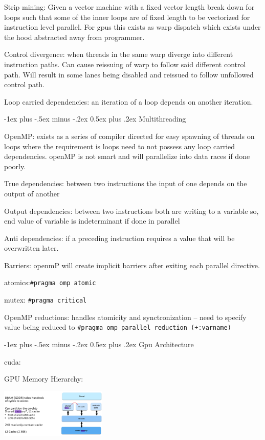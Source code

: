 \documentclass[letter,8pt,landscape]{article}
\makeatletter
\renewcommand{\section}{\@startsection{section}{1}{0mm}%
                                {-1ex plus -.5ex minus -.2ex}%
                                {0.5ex plus .2ex}%
                                {\normalfont\large\bfseries}}
\makeatother
\begin{document}
\begin{multicols}{3}
  Strip mining: Given a vector machine with a fixed vector length break down for
  loops such that some of the inner loops are of fixed length to be vectorized
  for instruction level parallel. For gpus this exists as warp dispatch which
  exists under the hood abstracted away from programmer.

  Control divergence: when threads in the same warp diverge into different
  instruction paths. Can cause reissuing of warp to follow said different
  control path. Will result in some lanes being disabled and reissued to follow
  unfollowed control path.

  Loop carried dependencies: an iteration of a loop depends on another
  iteration.

  \section{Multithreading}

  OpenMP: exists as a series of compiler directed for easy spawning of threads
  on loops where the requirement is loops need to not possess any loop carried
  dependencies. openMP is not smart and will parallelize into data races if done
  poorly. 

  True dependencies: between two instructions the input of one depends on the
  output of another

  Output dependencies: between two instructions both are writing to a variable
  so, end value of variable is indeterminant if done in parallel

  Anti dependencies: if a preceding instruction requires a value that will be
  overwritten later. 

  Barriers: openmP will create implicit barriers after exiting each parallel
  directive.

  atomics:\verb|#pragma omp atomic| 

  mutex: \verb|#pragma critical|

  OpenMP reductions: handles atomicity and synctronization -- need to specify
  value being reduced to \verb|#pragma omp parallel reduction (+:varname)|

  \section{Gpu Architecture}

  cuda:

  GPU Memory Hierarchy:
  \begin{center}
    \includegraphics[width=2in]{images/gpu-mem.jpg}
  \end{center}


\end{multicols}
\end{document}
